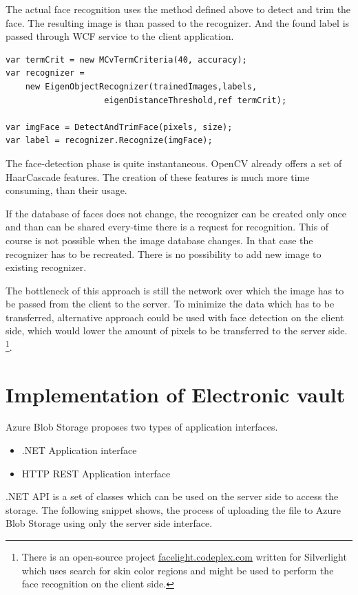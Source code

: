 The actual face recognition uses the method defined above to detect and trim the face. The resulting image is than passed to the recognizer. And the found label is passed through WCF service to the client application.

\begin{verbatim}
var termCrit = new MCvTermCriteria(40, accuracy);
var recognizer = 
	new EigenObjectRecognizer(trainedImages,labels,
             		eigenDistanceThreshold,ref termCrit);
             		
var imgFace = DetectAndTrimFace(pixels, size);
var label = recognizer.Recognize(imgFace);
\end{verbatim}

The face-detection phase is quite instantaneous. OpenCV already offers a set of HaarCascade features. The creation of these features is much more time consuming, than their usage.

If the database of faces does not change, the recognizer can be created only once and than can be shared every-time there is a request for recognition. This of course is not possible when the image database changes. In that case the recognizer has to be  recreated. There is no possibility to add new image to existing recognizer.

The bottleneck of this approach is still the network over which the image has to be passed from the client to the server. To minimize the data which has to be transferred, alternative approach could be used with face detection on the client side, which would lower the amount of pixels to be transferred to the server side. \footnote{There is an open-source project \href{facelight.codeplex.com}{facelight.codeplex.com} written for Silverlight which uses search for skin color regions and might be used to perform the face recognition on the client side.}.

\section {Implementation of Electronic vault}
Azure Blob Storage proposes two types of application interfaces. 

\begin{itemize}
	\item .NET Application interface
	\item HTTP REST Application interface
\end{itemize}

.NET API is a set of classes which can be used on the server side to access the storage. The following snippet shows, the process of uploading the file to Azure Blob Storage using only the server side interface.

